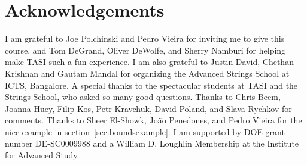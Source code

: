 \documentclass{ws-rv9x6}
\newcommand\<\langle
\renewcommand\>\rangle
\renewcommand\.{\cdot}
\begin{document}
\section*{Acknowledgements}

I am grateful to Joe Polchinski and Pedro Vieira for inviting me to give this course, and Tom DeGrand, Oliver DeWolfe, and Sherry Namburi for helping make TASI such a fun experience.  I am also grateful to Justin David, Chethan Krishnan and Gautam Mandal for organizing the Advanced Strings School at ICTS, Bangalore.  A special thanks to the spectacular students at TASI and the Strings School, who asked so many good questions.  Thanks to Chris Beem, Joanna Huey, Filip Kos, Petr Kravchuk, David Poland, and Slava Rychkov for comments.  Thanks to Sheer El-Showk, Jo\~ao Penedones, and Pedro Vieira for the nice example in section~\ref{sec:boundsexample}. I am supported by DOE grant number DE-SC0009988 and a William D. Loughlin Membership at the Institute for Advanced Study.
\end{document}

